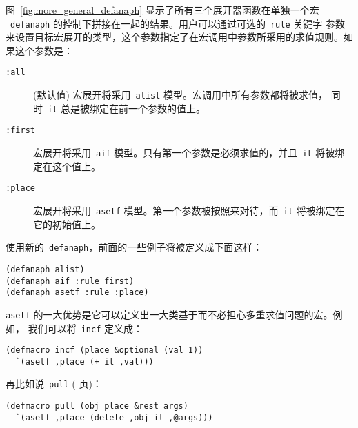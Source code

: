 图~\ref{fig:more_general_defanaph} 显示了所有三个展开器函数在单独一个宏
~\texttt{defanaph} 的控制下拼接在一起的结果。用户可以通过可选的~\texttt{rule} 关键字
参数来设置目标宏展开的类型，这个参数指定了在宏调用中参数所采用的求值规则。如果这个参数是：
\begin{description}
\item[\texttt{:all}]
  (默认值) 宏展开将采用~\texttt{alist} 模型。宏调用中所有参数都将被求值，
  同时~\texttt{it} 总是被绑定在前一个参数的值上。
\item[\texttt{:first}]
  宏展开将采用~\texttt{aif} 模型。只有第一个参数是必须求值的，并且~\texttt{it}
  将被绑定在这个值上。
\item[\texttt{:place}]
  宏展开将采用~\texttt{asetf} 模型。第一个参数被按照\gv{}来对待，而~\texttt{it}
  将被绑定在它的初始值上。
\end{description}
使用新的~\texttt{defanaph}，前面的一些例子将被定义成下面这样：
\begin{lstlisting}
(defanaph alist)
(defanaph aif :rule first)
(defanaph asetf :rule :place)
\end{lstlisting}

\texttt{asetf} 的一大优势是它可以定义出一大类基于\gv{}而不必担心多重求值问题的宏。例如，
我们可以将~\texttt{incf} 定义成：
\begin{lstlisting}
(defmacro incf (place &optional (val 1))
  `(asetf ,place (+ it ,val)))
\end{lstlisting}
再比如说~\texttt{pull} (\pageref{fig:more_complex_macros_on_setf} 页)：
\begin{lstlisting}
(defmacro pull (obj place &rest args)
  `(asetf ,place (delete ,obj it ,@args)))
\end{lstlisting}

